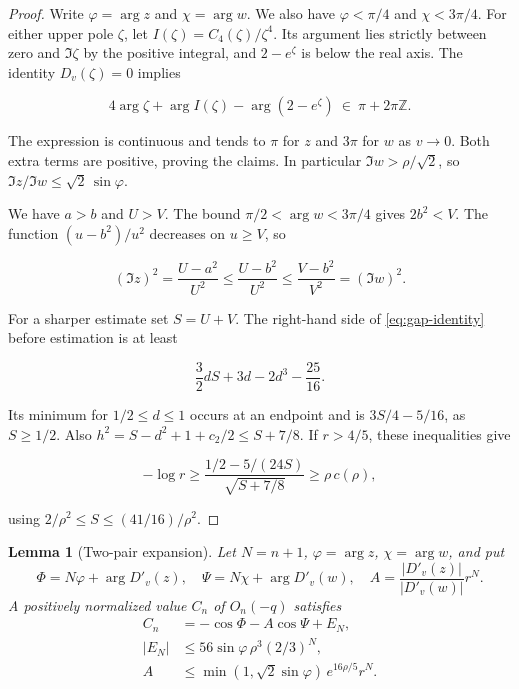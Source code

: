 \documentclass[11pt]{article}
\newtheorem{lemma}{Lemma}
\begin{document}
\begin{proof}
Write $\varphi=\arg z$ and $\chi=\arg w$. We also have $\varphi<\pi/4$ and $\chi<3\pi/4$. For either upper pole $\zeta$, let $I(\zeta)=C_4(\zeta)/\zeta^4$. Its argument lies strictly between zero and $\Im\zeta$ by the positive integral, and $2-e^\zeta$ is below the real axis. The identity \(D_v(\zeta)=0\) implies

\begin{equation*}
4\arg\zeta+\arg I(\zeta)-\arg(2-e^\zeta)\ \in\ \pi+2\pi\mathbb Z .
\end{equation*}

The expression is continuous and tends to $\pi$ for $z$ and $3\pi$ for $w$ as $v\to0$. Both extra terms are positive, proving the claims. In particular $\Im w>\rho/\sqrt2$, so $\Im z/\Im w\le\sqrt2\,\sin\varphi$.


We have $a>b$ and $U>V$. The bound $\pi/2<\arg w<3\pi/4$ gives $2b^2<V$. The function $(u-b^2)/u^2$ decreases on $u\ge V$, so

\begin{equation*}
(\Im z)^2=\frac{U-a^2}{U^2}\le\frac{U-b^2}{U^2}
\le\frac{V-b^2}{V^2}=(\Im w)^2.
\end{equation*}


For a sharper estimate set $S=U+V$. The right-hand side of \eqref{eq:gap-identity} before estimation is at least

\begin{equation*}
\frac32 dS+3d-2d^3-\frac{25}{16}.
\end{equation*}

Its minimum for $1/2\le d\le1$ occurs at an endpoint and is $3S/4-5/16$, as $S\ge1/2$. Also $h^2=S-d^2+1+c_2/2\le S+7/8$. If $r>4/5$, these inequalities give

\begin{equation*}
-\log r\ge\frac{1/2-5/(24S)}{\sqrt{S+7/8}}\ge\rho\,c(\rho),
\end{equation*}

using $2/\rho^2\le S\le(41/16)/\rho^2$.

\end{proof}

\begin{lemma}[Two-pair expansion]\label{lem:expansion}
Let \(N=n+1\), \(\varphi=\arg z\), \(\chi=\arg w\), and put
\[
\Phi=N\varphi+\arg D'_v(z),\quad \Psi=N\chi+\arg D'_v(w),\quad
A=\frac{|D'_v(z)|}{|D'_v(w)|}r^N.
\]
A positively normalized value \(C_n\) of \(O_n(-q)\) satisfies
\begin{align}
C_n&=-\cos\Phi-A\cos\Psi+E_N,\nonumber\\
|E_N|&\le 56\sin\varphi\,\rho^3(2/3)^N,\label{eq:tail}\\
A&\le \min(1,\sqrt2\sin\varphi)\,e^{16\rho/5}r^N.\label{eq:amplitude}
\end{align}
\end{lemma}
\end{document}
